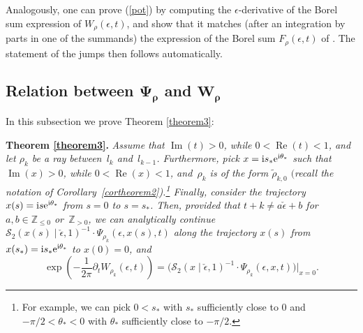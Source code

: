 \documentclass[pdftex]{sigma}
\numberwithin{equation}{section}
\begin{document}
\begin{Remark}
Analogously, one can prove (\ref{pot}) by computing the $\epsilon$-derivative of the Borel sum expression of $W_{\rho}(\epsilon,t)$, and show that it matches (after an integration by parts in one of the summands) the expression of the Borel sum $F_{\rho}(\epsilon,t)$ of \cite{ASTT21}. The statement of the jumps then follows automatically.
\end{Remark}

\subsection[Relation between $\Psi_{\rho}$ and $W_{\rho}$]{Relation between $\boldsymbol{\Psi_{\rho}}$ and $\boldsymbol{W_{\rho}}$}\label{sec:relationPsiPeriod}

In this subsection we prove Theorem \ref{theorem3}:

\medskip

\noindent
\textbf{Theorem \ref{theorem3}.}
{\it Assume that $\operatorname{Im}(t)>0$, while $0<\operatorname{Re}(t)<1$, and let $\rho_k$ be a ray between~$l_k$ and~$l_{k-1}$. Furthermore, pick $x=\mathrm{i} s_*{\rm e}^{\mathrm{i}\theta_*}$ such that $\operatorname{Im}(x)>0$, while $0<\operatorname{Re}(x)<1$, and~$\rho_k$ is of the form $\tilde{\rho}_{k,0}$ $($recall the notation of Corollary~{\rm \ref{cortheorem2})}.\footnote{For example, we can pick $0<s_*$ with $s_*$ sufficiently close to $0$ and $-\pi/2<\theta_*<0$ with $\theta_*$ sufficiently close to $-\pi/2$.\label{footnote9}}
Finally, consider the trajectory $x(s)=\mathrm{i} s{\rm e}^{\mathrm{i} \theta_*}$ from $s=0$ to $s=s_*$. Then, provided that $t+k\neq a\check{\epsilon}+b$ for $a,b\in \mathbb{Z}_{\leq 0}$ or~$\mathbb{Z}_{> 0}$, we can analytically continue $\mathcal{S}_2(x(s)\mid \check\epsilon,1)^{-1} \cdot\Psi_{\rho_k}(\epsilon,x(s),t)$ along the trajectory $x(s)$ from $x(s_*)=\mathrm{i} s_*{\rm e}^{\mathrm{i}\theta_*}$ to $x(0)=0$, and}
\begin{equation}\label{relWpsi}
 \exp\left(-\frac{1}{2\pi}\partial_tW_{\rho_k}(\epsilon,t)\right)=\big(\mathcal{S}_2(x\mid \check\epsilon,1)^{-1}\cdot \Psi_{\rho_k}(\epsilon,x,t)\big)\big|_{x=0}.
\end{equation}
\end{document}
